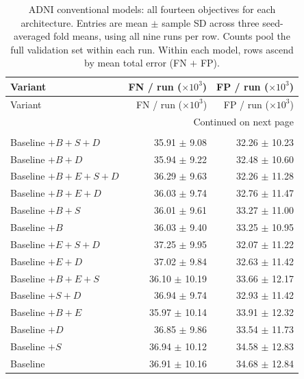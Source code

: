 \documentclass[12pt,a4paper]{article}
\begin{document}
\begingroup\footnotesize{}
\setlength{\tabcolsep}{4pt}
\renewcommand{\arraystretch}{1.12}
\begin{longtable}{@{}lrr@{}}
\caption{ADNI conventional models: all fourteen objectives for each architecture. Entries are mean $\pm$ sample SD across three seed-averaged fold means, using all nine runs per row. Counts pool the full validation set within each run. Within each model, rows ascend by mean total error (FN $+$ FP).}
\label{tab:adni-all-errors}\\
\hline
Variant & \shortstack{FN / run\\($\times 10^{3}$)} & \shortstack{FP / run\\($\times 10^{3}$)} \\ \hline
\endfirsthead
\hline
Variant & \shortstack{FN / run\\($\times 10^{3}$)} & \shortstack{FP / run\\($\times 10^{3}$)} \\ \hline
\endhead
\hline
\multicolumn{3}{r}{Continued on next page}\\
\endfoot
\hline\endlastfoot
\multicolumn{3}{@{}l}{\textbf{nnU-Net}}\\*
Baseline $+B+S+D$ & 35.91 $\pm$ 9.08 & 32.26 $\pm$ 10.23 \\
Baseline $+B+D$ & 35.94 $\pm$ 9.22 & 32.48 $\pm$ 10.60 \\
Baseline $+B+E+S+D$ & 36.29 $\pm$ 9.63 & 32.26 $\pm$ 11.28 \\
Baseline $+B+E+D$ & 36.03 $\pm$ 9.74 & 32.76 $\pm$ 11.47 \\
Baseline $+B+S$ & 36.01 $\pm$ 9.61 & 33.27 $\pm$ 11.00 \\
Baseline $+B$ & 36.03 $\pm$ 9.40 & 33.25 $\pm$ 10.95 \\
Baseline $+E+S+D$ & 37.25 $\pm$ 9.95 & 32.07 $\pm$ 11.22 \\
Baseline $+E+D$ & 37.02 $\pm$ 9.84 & 32.63 $\pm$ 11.42 \\
Baseline $+B+E+S$ & 36.10 $\pm$ 10.19 & 33.66 $\pm$ 12.17 \\
Baseline $+S+D$ & 36.94 $\pm$ 9.74 & 32.93 $\pm$ 11.42 \\
Baseline $+B+E$ & 35.97 $\pm$ 10.14 & 33.91 $\pm$ 12.32 \\
Baseline $+D$ & 36.85 $\pm$ 9.86 & 33.54 $\pm$ 11.73 \\
Baseline $+S$ & 36.94 $\pm$ 10.12 & 34.58 $\pm$ 12.83 \\
Baseline & 36.91 $\pm$ 10.16 & 34.68 $\pm$ 12.84 \\

\end{longtable}
\end{document}

